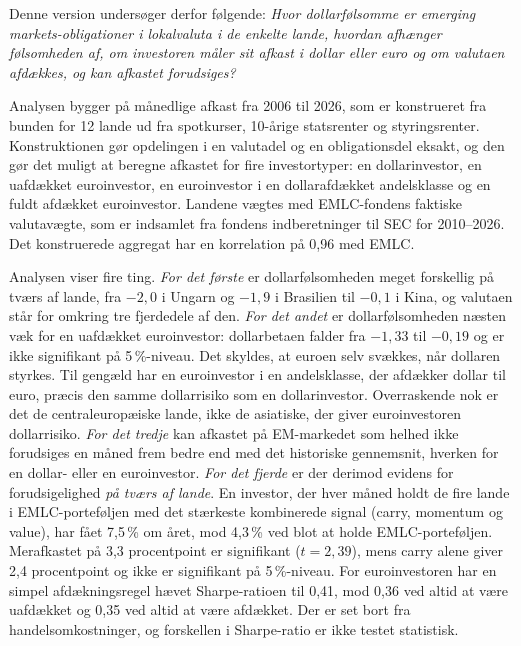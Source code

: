 \documentclass[11pt,a4paper]{article}
\begin{document}
Denne version undersøger derfor følgende:
\emph{Hvor dollarfølsomme er emerging markets-obligationer i lokalvaluta i de enkelte lande, hvordan afhænger følsomheden af, om investoren måler sit afkast i dollar eller euro og om valutaen afdækkes, og kan afkastet forudsiges?}

Analysen bygger på månedlige afkast fra 2006 til 2026, som er konstrueret fra bunden for 12 lande ud fra spotkurser, 10-årige statsrenter og styringsrenter. Konstruktionen gør opdelingen i en valutadel og en obligationsdel eksakt, og den gør det muligt at beregne afkastet for fire investortyper: en dollarinvestor, en uafdækket euroinvestor, en euroinvestor i en dollarafdækket andelsklasse og en fuldt afdækket euroinvestor. Landene vægtes med EMLC-fondens faktiske valutavægte, som er indsamlet fra fondens indberetninger til SEC for 2010--2026. Det konstruerede aggregat har en korrelation på 0,96 med EMLC.

Analysen viser fire ting. \emph{For det første} er dollarfølsomheden meget forskellig på tværs af lande, fra $-2{,}0$ i Ungarn og $-1{,}9$ i Brasilien til $-0{,}1$ i Kina, og valutaen står for omkring tre fjerdedele af den. \emph{For det andet} er dollarfølsomheden næsten væk for en uafdækket euroinvestor: dollarbetaen falder fra $-1{,}33$ til $-0{,}19$ og er ikke signifikant på 5\,\%-niveau. Det skyldes, at euroen selv svækkes, når dollaren styrkes. Til gengæld har en euroinvestor i en andelsklasse, der afdækker dollar til euro, præcis den samme dollarrisiko som en dollarinvestor. Overraskende nok er det de centraleuropæiske lande, ikke de asiatiske, der giver euroinvestoren dollarrisiko. \emph{For det tredje} kan afkastet på EM-markedet som helhed ikke forudsiges en måned frem bedre end med det historiske gennemsnit, hverken for en dollar- eller en euroinvestor. \emph{For det fjerde} er der derimod evidens for forudsigelighed \emph{på tværs af lande}. En investor, der hver måned holdt de fire lande i EMLC-porteføljen med det stærkeste kombinerede signal (carry, momentum og value), har fået 7,5\,\% om året, mod 4,3\,\% ved blot at holde EMLC-porteføljen. Merafkastet på 3,3 procentpoint er signifikant ($t=2{,}39$), mens carry alene giver 2,4 procentpoint og ikke er signifikant på 5\,\%-niveau. For euroinvestoren har en simpel afdækningsregel hævet Sharpe-ratioen til 0,41, mod 0,36 ved altid at være uafdækket og 0,35 ved altid at være afdækket. Der er set bort fra handelsomkostninger, og forskellen i Sharpe-ratio er ikke testet statistisk.

\end{document}
